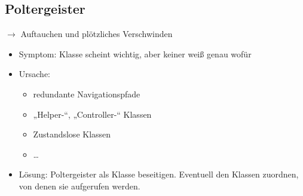 \subsection{Poltergeister}
$\to$ Auftauchen und plötzliches Verschwinden
\begin{itemize}
\item Symptom: Klasse scheint wichtig, aber keiner weiß genau wofür
\item Ursache: 
\begin{itemize}
\item redundante Navigationspfade
\item „Helper-“, „Controller-“ Klassen
\item Zustandslose Klassen
\item …
\end{itemize}
\item Lösung: Poltergeister als Klasse beseitigen. Eventuell den Klassen zuordnen, von denen sie aufgerufen werden.
\end{itemize}














